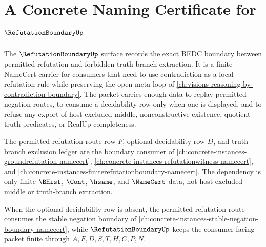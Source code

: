 \chapter{A Concrete Naming Certificate for $\RefutationBoundaryUp$}
\label{ch:concrete-instances-refutationboundary-namecert}

The $\RefutationBoundaryUp$ surface records the exact BEDC boundary between permitted refutation and forbidden truth-branch extraction. It is a finite NameCert carrier for consumers that need to use contradiction as a local refutation rule while preserving the open meta loop of \autoref{ch:visions-reasoning-by-contradiction-boundary}. The packet carries enough data to replay permitted negation routes, to consume a decidability row only when one is displayed, and to refuse any export of host excluded middle, nonconstructive existence, quotient truth predicates, or RealUp completeness.

The permitted-refutation route row $F$, optional decidability row $D$, and truth-branch exclusion ledger are the boundary consumer of \autoref{ch:concrete-instances-groundrefutation-namecert}, \autoref{ch:concrete-instances-refutationwitness-namecert}, and \autoref{ch:concrete-instances-finiterefutationboundary-namecert}. The dependency is only finite $\BHist$, $\Cont$, $\hsame$, and $\NameCert$ data, not host excluded middle or truth-branch extraction.

When the optional decidability row is absent, the permitted-refutation route consumes the stable negation boundary of \autoref{ch:concrete-instances-stable-negation-boundary-namecert}, while $\RefutationBoundaryUp$ keeps the consumer-facing packet finite through $A,F,D,S,T,H,C,P,N$.

